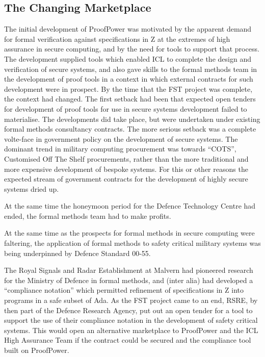 \documentclass[10pt,titlepage]{book}
\def\Product{ProofPower}
\begin{document}
\subsection{The Changing Marketplace}

The initial development of {\Product} was motivated by the apparent demand for formal verification against specifications in Z at the extremes of high assurance in secure computing, and by the need for tools to support that process.
The development supplied tools which enabled ICL to complete the design and verification of secure systems, and also gave skills to the formal methods team in the development of proof tools in a context in which external contracts for such development were in prospect.
By the time that the FST project was complete, the context had changed.
The first setback had been that expected open tenders for development of proof tools for use in secure systems development failed to materialise.
The developments did take place, but were undertaken under existing formal methods consultancy contracts.
The more serious setback was a complete volte-face in government policy on the development of secure systems.
The dominant trend in military computing procurement was towards ``COTS'', Customised Off The Shelf procurements, rather than the more traditional and more expensive development of bespoke systems.
For this or other reasons the expected stream of government contracts for the development of highly secure systems dried up.

At the same time the honeymoon period for the Defence Technology Centre had ended, the formal methods team had to make profits.

At the same time as the prospects for formal methods in secure computing were faltering, the application of formal methods to safety critical military systems was being underpinned by Defence Standard 00-55.

The Royal Signals and Radar Establishment at Malvern had pioneered research for the Ministry of Defence in formal methods, and (inter alia) had developed a ``compliance notation'' which permitted refinement of specifications in Z into programs in a safe subset of Ada.
As the FST project came to an end, RSRE, by then part of the Defence Research Agency, put out an open tender for a tool to support the use of their compliance notation in the development of safety critical systems.
This would open an alternative marketplace to {\Product} and the ICL High Assurance Team if the contract could be secured and the compliance tool built on {\Product}. 
\end{document}
